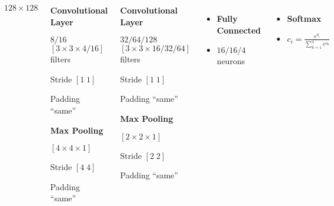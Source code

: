\begin{frame}
\begin{columns}
{\begin{columns}
                     {$128\times 128$}
                \end{columns}
            }
             {
                \begin{itemize}
                    \item \textbf{Convolutional Layer}
                    \item $8/16$ $\left[3\times 3\times 4/16\right]$ filters
                    \item Stride $\left[1\;1\right]$
                    \item Padding ``same''
                     {
                        \item \textbf{Max Pooling}
                        \item $\left[4\times 4\times 1\right]$
                        \item Stride $\left[4\;4\right]$
                        \item Padding ``same''
                    }
                \end{itemize}
            }
             {
                \begin{itemize}
                    \item \textbf{Convolutional Layer}
                    \item $32/64/128$ $\left[3\times 3\times 16/32/64\right]$ filters
                    \item Stride $\left[1\;1\right]$
                    \item Padding ``same''
                     {
                        \item \textbf{Max Pooling}
                        \item $\left[2\times 2\times 1\right]$
                        \item Stride $\left[2\;2\right]$
                        \item Padding ``same''
                    }
                \end{itemize}
            }
             {
                \begin{itemize}
                    \item \textbf{Fully Connected}
                    \item $16/16/4$ neurons
                \end{itemize}
            }
             {
                \begin{itemize}
                    \item \textbf{Softmax}
                    \item $c_i = \frac{e^{o_i}}{\sum_{k = 1}^4 e^{o_k}}$
                \end{itemize}
            }
    \end{columns}
\end{frame}

